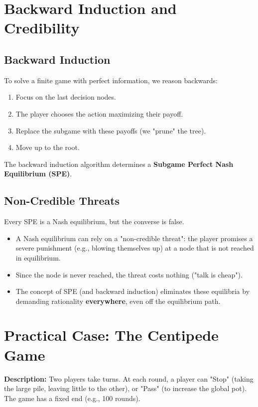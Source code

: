 \section{Backward Induction and Credibility}

\subsection{Backward Induction}
To solve a finite game with perfect information, we reason backwards:
\begin{enumerate}
    \item Focus on the last decision nodes.
    \item The player chooses the action maximizing their payoff.
    \item Replace the subgame with these payoffs (we "prune" the tree).
    \item Move up to the root.
\end{enumerate}

\begin{theoreme}
The backward induction algorithm determines a \textbf{Subgame Perfect Nash Equilibrium (SPE)}.
\end{theoreme}

\subsection{Non-Credible Threats}
Every SPE is a Nash equilibrium, but the converse is false.
\begin{itemize}
    \item A Nash equilibrium can rely on a "non-credible threat": the player promises a severe punishment (e.g., blowing themselves up) at a node that is not reached in equilibrium.
    \item Since the node is never reached, the threat costs nothing ("talk is cheap").
    \item The concept of SPE (and backward induction) eliminates these equilibria by demanding rationality \textbf{everywhere}, even off the equilibrium path.
\end{itemize}

\section{Practical Case: The Centipede Game}

\textbf{Description:}
Two players take turns. At each round, a player can "Stop" (taking the large pile, leaving little to the other), or "Pass" (to increase the global pot).
The game has a fixed end (e.g., 100 rounds).

